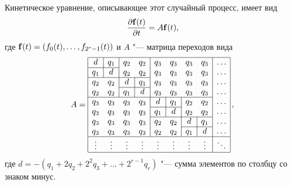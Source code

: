 Кинетическое уравнение, описывающее этот случайный процесс, имеет вид
\begin{equation}
\frac{\partial \bold f (t )}{\partial t} = A \bold f (t),
\label{sizova:kin}
\end{equation}
где $\bold f (t) = \left(f_0(t), \ldots, f_{2^r - 1}(t)\right)$ и
$A$ "--- матрица переходов вида
\begin{equation}
A =
\begin{array}{|ccccccccc|}
\hline
\multicolumn{1}{|c|}{d} & \multicolumn{1}{c|}{q_1} & q_2 & \multicolumn{1}{c|}{q_2} & q_3 & q_3 & q_3 & \multicolumn{1}{c|}{q_3} & \dots\\
\cline{1-2}
\multicolumn{1}{|c|}{q_1} & \multicolumn{1}{c|}{d} & q_2 & \multicolumn{1}{c|}{q_2} & q_3 & q_3 & q_3 & \multicolumn{1}{c|}{q_3} & \dots\\
\cline{1-4}
q_2 & q_2& \multicolumn{1}{|c|}{d} & \multicolumn{1}{c|}{q_1} & q_3 & q_3 & q_3 & \multicolumn{1}{c|}{q_3} & \dots\\
\cline{3-4}
q_2 & q_2 & \multicolumn{1}{|c|}{q_1} & \multicolumn{1}{c|}{d} & q_3 & q_3 & q_3 & \multicolumn{1}{c|}{q_3} & \dots\\
\cline{1-8}
q_3 & q_3 & q_3 & q_3 & \multicolumn{1}{|c|}{d} & \multicolumn{1}{c|}{q_1} & q_2 & \multicolumn{1}{c|}{q_2} &\dots\\
\cline{5-6}
q_3 & q_3 & q_3 & q_3 & \multicolumn{1}{|c|}{q_1} & \multicolumn{1}{c|}{d} & q_2 & \multicolumn{1}{c|}{q_2} &\dots\\
\cline{5-8}
q_3 & q_3 & q_3 & \multicolumn{1}{c|}{q_3} & q_2 & q_2 & \multicolumn{1}{|c|}{d} & \multicolumn{1}{c|}{q_1} &\dots\\
\cline{7-8}
q_3 & q_3 & q_3 & \multicolumn{1}{c|}{q_3} & q_2 & q_2 & \multicolumn{1}{|c|}{q_1} & \multicolumn{1}{c|}{d} &\dots\\
\hline
\vdots & \vdots & \vdots & \vdots & \vdots & \vdots & \vdots & \multicolumn{1}{c|}{\vdots} & \ddots\\
\hline
\end{array}\, , \label{sizova:symbin}
\end{equation}
где $d = -\left(q_1 + 2 q_2 +2^2 q_3 + \dots + 2^{r - 1}
q_r\right)$ "--- сумма элементов по столбцу со знаком минус.

